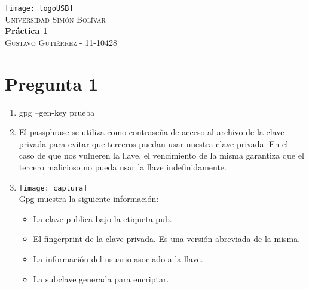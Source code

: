 \documentclass{article}
\begin{document}
    \begin{center}
    	\texttt{[image: logoUSB]}\\[0.1cm]
    	\textsc{Universidad Simón Bolívar}\\[0.7cm]
        { \LARGE \bfseries Práctica 1}\\[0.3cm]
        \textsc{Gustavo Gutiérrez - 11-10428}\\[0.1cm]
    \end{center}
\clearpage

\section{Pregunta 1}
\begin{enumerate}
	\item gpg --gen-key prueba
	\item El passphrase se utiliza como contraseña de acceso al archivo de la clave
		privada para evitar que terceros puedan usar nuestra clave privada. En el caso de que nos vulneren la llave,
		el vencimiento de la misma garantiza que el tercero malicioso no pueda usar la llave indefinidamente.
	\item \texttt{[image: captura]}\\ Gpg muestra la siguiente información:
	\begin{itemize}
		\item La clave publica bajo la etiqueta pub.
		\item El fingerprint de la clave privada. Es una versión abreviada de la misma.
		\item La información del usuario asociado a la llave.
		\item La subclave generada para encriptar.
	\end{itemize}
\end{enumerate}
\end{document}
